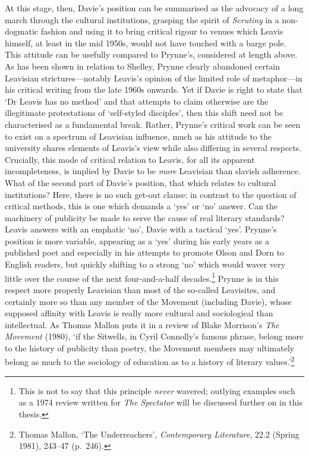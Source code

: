 \documentclass[]{article}
\begin{document}
\noindent At this stage, then, Davie's position can be summarised as the
advocacy of a long march through the cultural institutions, grasping the
spirit of \emph{Scrutiny} in a non-dogmatic fashion and using it to
bring critical rigour to venues which Leavis himself, at least in the
mid 1950s, would not have touched with a barge pole. This attitude can
be usefully compared to Prynne's, considered at length above. As has
been shown in relation to Shelley, Prynne clearly abandoned certain
Leavisian strictures---notably Leavis's opinion of the limited role of
metaphor---in his critical writing from the late 1960s onwards. Yet if
Davie is right to state that `Dr Leavis has no method' and that attempts
to claim otherwise are the illegitimate protestations of `self-styled
disciples', then this shift need not be characterised as a fundamental
break. Rather, Prynne's critical work can be seen to exist on a spectrum
of Leavisian influence, much as his attitude to the university shares
elements of Leavis's view while also differing in several respects.
Crucially, this mode of critical relation to Leavis, for all its
apparent incompleteness, is implied by Davie to be \emph{more} Leavisian
than slavish adherence. What of the second part of Davie's position,
that which relates to cultural institutions? Here, there is no such
get-out clause: in contrast to the question of critical methods, this is
one which demands a `yes' or `no' answer. Can the machinery of publicity
be made to serve the cause of real literary standards? Leavis answers
with an emphatic `no', Davie with a tactical `yes'. Prynne's position is
more variable, appearing as a `yes' during his early years as a
published poet and especially in his attempts to promote Olson and Dorn
to English readers, but quickly shifting to a strong `no' which would
waver very little over the course of the next four-and-a-half
decades.\footnote{This is not to say that this principle \emph{never}
  wavered; outlying examples such as a 1974 review written for \emph{The
  Spectator} will be discussed further on in this thesis.} Prynne is in
this respect more properly Leavisian than most of the so-called
Leavisites, and certainly more so than any member of the Movement
(including Davie), whose supposed affinity with Leavis is really more
cultural and sociological than intellectual. As Thomas Mallon puts it in
a review of Blake Morrison's \emph{The Movement} (1980), `if the
Sitwells, in Cyril Connolly's famous phrase, belong more to the history
of publicity than poetry, the Movement members may ultimately belong as
much to the sociology of education as to a history of literary
values.'\footnote{Thomas Mallon, `The Underreachers', \emph{Contemporary
  Literature}, 22.2 (Spring 1981), 243--47 (p.~246).}
\end{document}

